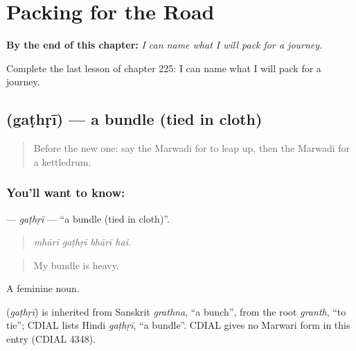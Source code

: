 
\chapter{Packing for the Road}
\label{ch:mw-packing-for-the-road}

\begin{chapteropening}
\textbf{By the end of this chapter:} \emph{I can name what I will pack for a journey.}

Complete the last lesson of chapter 225: I can name what I will pack for a journey.
\end{chapteropening}

\section[\texorpdfstring{\mw{गठड़ी} (gaṭhṛī)}{गठड़ी (gaṭhṛī)}]{ (gaṭhṛī) — a bundle (tied in cloth)}

\label{lesson:MW-C225-gathri}



\begin{quote}
Before the new one: say the Marwadi for to leap up, then the Marwadi for a kettledrum.
\end{quote}

\subsection*{You'll want to know: }
\textbf{} — \emph{gaṭhṛī} — \textquotedblleft{}a bundle (tied in cloth)\textquotedblright{}.

\begin{quote}
   
\end{quote}

\begin{quote}
\emph{mhārī gaṭhṛī bhārī hai.}
\end{quote}

\begin{quote}
My bundle is heavy.
\end{quote}

A feminine noun.

\begin{cousinweb}
\textbf{} (\emph{gaṭhṛī}) is inherited from Sanskrit \emph{grathna}, \textquotedblleft{}a bunch\textquotedblright{}, from the root \emph{granth}, \textquotedblleft{}to tie\textquotedblright{}; CDIAL lists Hindi \emph{gaṭhṛī}, \textquotedblleft{}a bundle\textquotedblright{}. CDIAL gives no Marwari form in this entry (CDIAL 4348).
\end{cousinweb}

